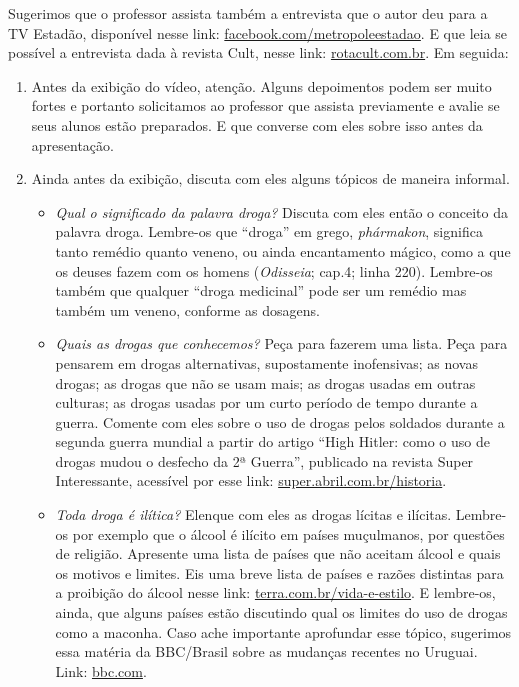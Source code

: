 \documentclass[12pt]{extarticle}
\begin{document}
		Sugerimos que o professor assista também a entrevista que o autor
		deu para a TV Estadão, disponível nesse link: 
		\href{https://www.facebook.com/209792265728043/videos/1772581939449060}{facebook.com/metropoleestadao}. E que leia se possível a entrevista dada à revista Cult, nesse 
		link: \href{https://rotacult.com.br/2017/08/dr-luis-marra-fala-sobre-o-livro-cronicas-do-crack/}{rotacult.com.br}. Em seguida:
	\begin{enumerate}
		\item Antes da exibição do vídeo, atenção. Alguns depoimentos podem ser muito fortes e portanto solicitamos 
		ao professor que assista previamente e avalie se seus alunos 
		estão preparados. E que converse com eles sobre isso antes da apresentação.
		\item Ainda antes da exibição, discuta com eles alguns tópicos de
		maneira informal. 

		\begin{itemize}
			\item \textit{Qual o significado da palavra droga?} Discuta com eles então o conceito da 
			palavra droga. Lembre-os que ``droga'' 
			em grego, \textit{phármakon}, significa tanto remédio quanto veneno, ou ainda 
			encantamento mágico, como a que os deuses fazem com os homens (\textit{Odisseia}; 
			cap.4; linha 220). 
			Lembre-os também que qualquer ``droga 
			medicinal'' pode ser um remédio mas também um veneno, conforme as dosagens. 

			\item \textit{Quais as drogas que conhecemos?} Peça para fazerem uma lista. Peça para 
			pensarem em drogas alternativas, supostamente inofensivas; as novas drogas; 
			as drogas que não se usam mais; as drogas usadas em outras culturas; as drogas usadas
			por um curto período de tempo durante a guerra. Comente com eles sobre o 
			uso de drogas pelos soldados durante a segunda guerra mundial a partir do 
			artigo ``High Hitler: como o uso de drogas mudou o desfecho da 2ª Guerra'', 
			publicado na revista Super Interessante, acessível por esse link: 
			\href{https://super.abril.com.br/historia/high-hitler-como-o-uso-de-drogas-mudou-o-desfecho-da-2a-guerra/}{super.abril.com.br/historia}.

			\item \textit{Toda droga é ilítica?} Elenque com eles as drogas lícitas e ilícitas. Lembre-os 
			por exemplo que o álcool é ilícito em países muçulmanos, por questões de religião. 
			Apresente uma lista de países que não aceitam álcool e quais os motivos e limites. 
			Eis uma breve lista de países e razões distintas para a proibição do álcool 
			nesse link: \href{https://www.terra.com.br/vida-e-estilo/turismo/internacional/jornal-lista-10-paises-onde-bebida-alcoolica-e-proibida,a1aebf5da7afe310VgnVCM5000009ccceb0aRCRD.html}{terra.com.br/vida-e-estilo}. 
			E lembre-os, ainda, que alguns países estão discutindo 
			qual os limites do uso de drogas como a maconha. Caso ache importante 
			aprofundar esse tópico, sugerimos essa matéria da BBC/Brasil sobre 
			as mudanças recentes no Uruguai. Link: 
			\href{https://www.bbc.com/portuguese/internacional-50842940}{bbc.com}.
		

\end{itemize}
\end{enumerate}
\end{document}
